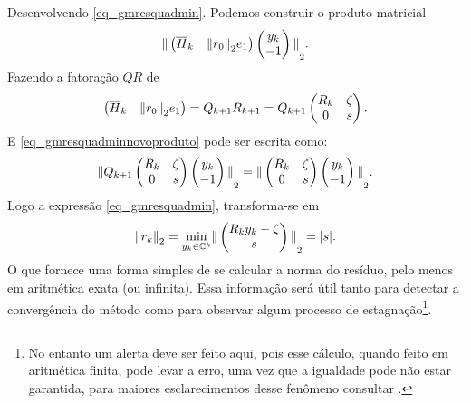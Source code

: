 Desenvolvendo \eqref{eq_gmresquadmin}. Podemos construir o produto matricial \begin{equation}\label{eq_gmresquadminnovoproduto}
{\Vert \begin{pmatrix}\overline{H}_k & \ensuremath{{\Vert r_0\Vert}}_2e_1\\\end{pmatrix}\begin{pmatrix}
                                                                  y_k \\
                                                                  -1 \\
                                                                \end{pmatrix}\Vert}_2.
\end{equation}
Fazendo a fatoração $QR$ de \[
\begin{pmatrix}\overline{H}_k & {\Vert r_0\Vert}_2e_1\\\end{pmatrix}=Q_{k+1}R_{k+1}= Q_{k+1} \begin{pmatrix}R_k & \zeta\\0 & s\end{pmatrix}.
       \]
E \eqref{eq_gmresquadminnovoproduto} pode ser escrita como:
\begin{equation}\label{eq_gmresquadminnovoprodutosemqk1}
{\Vert  Q_{k+1}\begin{pmatrix}R_k & \zeta\\0 & s\end{pmatrix} \begin{pmatrix}y_k \\ -1 \\  \end{pmatrix}\Vert}_2={\Vert  \begin{pmatrix}R_k & \zeta\\0 & s\end{pmatrix} \begin{pmatrix}y_k \\ -1 \\  \end{pmatrix}\Vert}_2.
\end{equation}
Logo a expressão  \eqref{eq_gmresquadmin}, transforma-se em
\begin{equation}\label{eq_gmresquadminnovamin}
{\Vert r_k\Vert}_2=\underset{y_k\in \mathbb{C}^k}{\min}{\Vert \begin{pmatrix}R_k y_k-\zeta \\ s  \end{pmatrix}\Vert}_2= |s|.
\end{equation}
O que fornece uma forma simples\label{arnol_calcuresid} de se calcular a norma do  resíduo, pelo menos em aritmética exata (ou infinita). Essa informação será útil tanto para detectar a convergência do método como para observar algum processo de estagnação\footnote{No entanto \label{arnol_calcuresidprob} um alerta deve ser feito aqui, pois esse cálculo, quando feito em aritmética  finita, pode levar a  erro, uma vez que a igualdade pode não estar garantida, para maiores esclarecimentos desse fenômeno consultar \cite[pág. 90]{Chaitin-ChatelinFraysse1996Lectures}.}.

